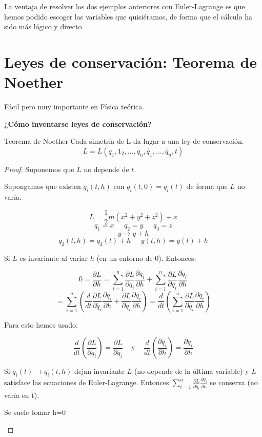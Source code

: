 La ventaja de resolver los dos ejemplos anteriores con Euler-Lagrange es que hemos podido escoger las variables que quisiéramos, de forma que el cálculo ha sido más lógico y directo\\



\section{Leyes de conservación: Teorema de Noether}
Fácil pero muy importante en Física teórica.

\textbf{¿Cómo inventarse leyes de conservación?}

\begin{theorem}{Teorema de Noether}
Cada simetría de L da lugar a una ley de conservación.
$$ L = L(q_1,1_2,...,q_n,\dot{q_1},...,\dot{q_n},t) $$
\end{theorem}
\begin{proof}
Suponemos que $L$ no depende de $t$.

Supongamos que existen $q_i(t,h)$ con $q_i(t,0) = q_i(t)$ de forma que $L$ no varía.

$$ L = \frac{1}{2} m (x^2 + y^2 + z^2 ) + x $$
$$ q_1 = x \;\;\;\;\; q_2 = y \;\;\;\;\; q_3 = z $$
$$ y \rightarrow y + h $$
$$ q_2(t,h) = q_2(t) + h \;\;\;\;\;  y(t,h) = y(t) + h $$

Si $L$ es invariante al variar $h$ (en un entorno de 0). Entonces:

$$0 = \frac{\partial L}{\partial h} = \sum_{i = 1}^n \frac{\partial L}{\partial q_i} \frac{\partial q_i}{\partial h} + \sum_{i = 1}^n \frac{\partial L}{\partial \dot{q_i}} \frac{\partial \dot{q_i}}{\partial h}
$$
$$= \sum_{i = 1}^n \left(\frac{d}{dt} \frac{\partial L}{\partial \dot{q_i}} \frac{\partial q_i}{\partial h} + \frac{\partial L}{\partial \dot{q_i}} \frac{\partial \dot{q_i}}{\partial h}\right)
= \frac{d}{dt} \left(\sum_{i = 1}^n \frac{\partial L}{\partial \dot{q_i}} \frac{\partial q_i}{\partial h}\right)$$

Para esto hemos usado:

$$ \frac{d}{dt}\left( \frac{\partial L}{\partial \dot{q_i}}\right) =  \frac{\partial L}{\partial q_i} \;\;\; \text{ y } \;\;\; \frac{d}{dt}\left( \frac{\partial q_i}{\partial h}\right) = \frac{\partial q_i}{\partial h}$$


Si $q_i(t) \rightarrow q_i(t,h)$ dejan invariante $L$ (no depende de la última variable) y $L$ satisface las ecuaciones de Euler-Lagrange. Entonces $\sum_{i = 1}^n \frac{\partial L}{\partial \dot{q_i}} \frac{\partial q_i}{\partial h}$ se conserva (no varía en t).

\begin{obs} Se suele tomar h=0 \end{obs}

\end{proof}


